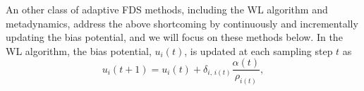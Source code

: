 \documentclass[reprint, superscriptaddress, floatfix]{revtex4-1}
\begin{document}
An other class of adaptive FDS methods,
including the WL algorithm\cite{wang2001, wang2001pre}
and metadynamics\cite{huber1994, laio2002, *laio2008, *barducci2011, *sutto2012},
address the above shortcoming
by continuously and incrementally updating the bias potential,
and we will focus on these methods below.
%
%
%
%
%
%
In the WL algorithm\cite{wang2001, wang2001pre},
the bias potential, $u_i(t)$, is updated
at each sampling step $t$ as
%
\begin{equation}
  u_i(t+1)
  =
  u_i(t)
  +
  \delta_{i, \, i(t)}
  \frac{ \alpha(t) } { \rho_{i(t)} }
  ,
\label{eq:wl_update}
\end{equation}
\end{document}
